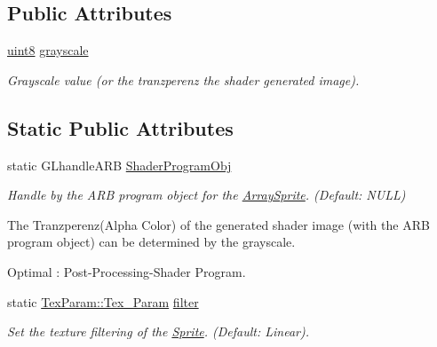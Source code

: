 \subsection*{Public Attributes}
\begin{DoxyCompactItemize}
\item 
\hypertarget{class_f2_c_1_1_simple_sprite_a72871a4bdff954844ebe4243aa859e13}{
\hyperlink{namespace_f2_c_a711deb33697d145669b9c0c4fe87c7ca}{uint8} \hyperlink{class_f2_c_1_1_simple_sprite_a72871a4bdff954844ebe4243aa859e13}{grayscale}}
\label{class_f2_c_1_1_simple_sprite_a72871a4bdff954844ebe4243aa859e13}

\begin{DoxyCompactList}\small\item\em Grayscale value (or the tranzperenz the shader generated image). \item\end{DoxyCompactList}\end{DoxyCompactItemize}
\subsection*{Static Public Attributes}
\begin{DoxyCompactItemize}
\item 
\hypertarget{class_f2_c_1_1_simple_sprite_a99c2e7a0334bc761eb1e2017c3fdf347}{
static GLhandleARB \hyperlink{class_f2_c_1_1_simple_sprite_a99c2e7a0334bc761eb1e2017c3fdf347}{ShaderProgramObj}}
\label{class_f2_c_1_1_simple_sprite_a99c2e7a0334bc761eb1e2017c3fdf347}

\begin{DoxyCompactList}\small\item\em Handle by the ARB program object for the \hyperlink{class_f2_c_1_1_array_sprite}{ArraySprite}. (Default: NULL) \par
 The Tranzperenz(Alpha Color) of the generated shader image (with the ARB program object) can be determined by the grayscale. \par
 Optimal : Post-\/Processing-\/Shader Program. \item\end{DoxyCompactList}\item 
\hypertarget{class_f2_c_1_1_simple_sprite_ae4a2a18c63ffab85ef5da18dc0366edc}{
static \hyperlink{namespace_f2_c_1_1_tex_param_a64299c3972944468af4e8b0394c936c6}{TexParam::Tex\_\-Param} \hyperlink{class_f2_c_1_1_simple_sprite_ae4a2a18c63ffab85ef5da18dc0366edc}{filter}}
\label{class_f2_c_1_1_simple_sprite_ae4a2a18c63ffab85ef5da18dc0366edc}

\begin{DoxyCompactList}\small\item\em Set the texture filtering of the \hyperlink{class_f2_c_1_1_sprite}{Sprite}. (Default: Linear). \item\end{DoxyCompactList}\end{DoxyCompactItemize}
